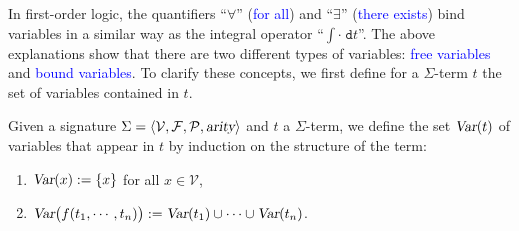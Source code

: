 In first-order logic, the quantifiers ``$\forall$'' (\textcolor{blue}{for all}) and ``$\exists$''
(\textcolor{blue}{there exists}) bind variables in a similar way as the integral operator
``$\int \cdot\; \mathtt{d}t$''. The above explanations show that there are two different types of 
variables: \textcolor{blue}{free variables} and \textcolor{blue}{bound variables}.
To clarify these concepts, we first define for a
$\Sigma$-term $t$ the set of variables contained in $t$.

\begin{Definition}[$\var(t)$]
  Given a signature $\Sigma = \langle \mathcal{V}, \mathcal{F}, \mathcal{P}, \textsl{arity} \rangle$ and
  $t$ a $\Sigma$-term, we define the set \textcolor{blue}{$\var(t)$} of variables that appear in $t$
  by induction on the structure of the term:
  \begin{enumerate}
    \item $\textsl{Var}(x) := \{ x \}$ \quad for all $x \in \mathcal{V}$,
    \item $\textsl{Var}\bigl(f(t_1,\cdots,t_n)\bigr) := \textsl{Var}(t_1) \cup \cdots \cup \textsl{Var}(t_n)$.
          \eox
  \end{enumerate}
\end{Definition}

